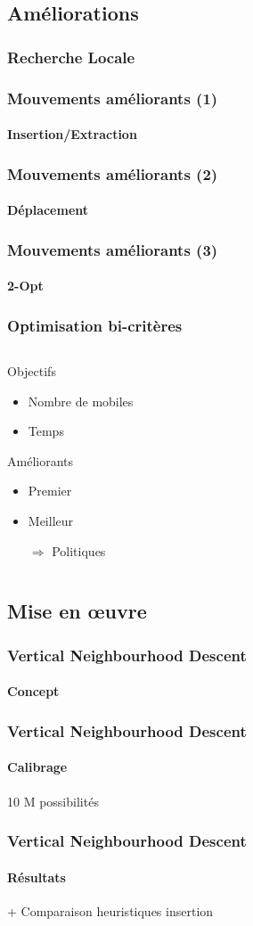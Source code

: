 \subsection{Améliorations}
\begin{frame}
	\frametitle{Recherche Locale}
\end{frame}
\begin{frame}
	\frametitle{Mouvements améliorants (1)}
	\framesubtitle{Insertion/Extraction}
\end{frame}
\begin{frame}
	\frametitle{Mouvements améliorants (2)}
	\framesubtitle{Déplacement}
\end{frame}
\begin{frame}
	\frametitle{Mouvements améliorants (3)}
	\framesubtitle{2-Opt}
\end{frame}
\begin{frame}
	\frametitle{Optimisation bi-critères}
	\begin{columns}
		\begin{column}{.37\linewidth}
			\begin{alertblock}{Objectifs}
				\begin{itemize}
					\item Nombre de mobiles
					\item Temps
				\end{itemize}
			\end{alertblock}
			\begin{exampleblock}{Améliorants}
				\begin{itemize}
					\item Premier
					\item Meilleur
					\item[$\Rightarrow$] Politiques
				\end{itemize}
			\end{exampleblock}
		\end{column}
		\begin{column}{.63\linewidth}
			\begin{center}
			
			\end{center}
		\end{column}
	\end{columns}
\end{frame}

\subsection{Mise en \oe uvre}
\begin{frame}
	\frametitle{Vertical Neighbourhood Descent}
	\framesubtitle{Concept}
\end{frame}
\begin{frame}
	\frametitle{Vertical Neighbourhood Descent}
	\framesubtitle{Calibrage}
	10 M possibilités
\end{frame}
\begin{frame}
	\frametitle{Vertical Neighbourhood Descent}
	\framesubtitle{Résultats}
	+ Comparaison heuristiques insertion
\end{frame}